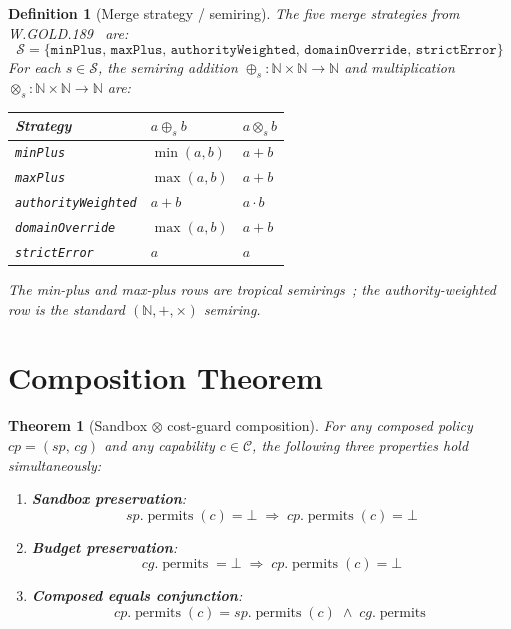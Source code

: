 \documentclass[sigconf]{acmart}
\newtheorem{definition}{Definition}
\newtheorem{theorem}{Theorem}
\newcommand{\compose}{\mathbin{\otimes}}
\newcommand{\permits}{\operatorname{permits}}
\newcommand{\mergeadd}{\mathbin{\oplus}}
\newcommand{\mergemul}{\mathbin{\otimes}}
\newcommand{\SP}{\mathit{sp}}
\newcommand{\CG}{\mathit{cg}}
\newcommand{\CP}{\mathit{cp}}
\begin{document}
\begin{definition}[Merge strategy / semiring]
\label{def:semiring}
The five \emph{merge strategies} from W.GOLD.189~\cite{paper-3-crdt-ecoop2027}
are:
\[
  \mathcal{S} = \{\texttt{minPlus},\,\texttt{maxPlus},\,\texttt{authorityWeighted},\,\texttt{domainOverride},\,\texttt{strictError}\}
\]
For each $s \in \mathcal{S}$, the semiring addition
$\mergeadd_s : \mathbb{N} \times \mathbb{N} \to \mathbb{N}$ and
multiplication $\mergemul_s : \mathbb{N} \times \mathbb{N} \to \mathbb{N}$
are:

\medskip
\begin{center}
\begin{tabular}{lll}
\toprule
Strategy & $a \mergeadd_s b$ & $a \mergemul_s b$ \\
\midrule
\texttt{minPlus}           & $\min(a,b)$      & $a + b$ \\
\texttt{maxPlus}           & $\max(a,b)$      & $a + b$ \\
\texttt{authorityWeighted} & $a + b$          & $a \cdot b$ \\
\texttt{domainOverride}    & $\max(a,b)$      & $a + b$ \\
\texttt{strictError}       & $a$              & $a$ \\
\bottomrule
\end{tabular}
\end{center}
\medskip

The min-plus and max-plus rows are tropical semirings~\cite{mohri2002semiring,green-semiring2007};
the authority-weighted row is the standard $(\mathbb{N},+,\times)$ semiring.
\end{definition}

\section{Composition Theorem}
\label{sec:theorem}

\begin{theorem}[Sandbox $\compose$ cost-guard composition]
\label{thm:main}
For any composed policy $\CP = (\SP,\,\CG)$ and any capability $c \in
\mathcal{C}$, the following three properties hold simultaneously:

\begin{enumerate}
  \item \textbf{Sandbox preservation}:
        \[\SP.\permits(c) = \bot \;\Longrightarrow\; \CP.\permits(c) = \bot\]
  \item \textbf{Budget preservation}:
        \[\CG.\permits = \bot \;\Longrightarrow\; \CP.\permits(c) = \bot\]
  \item \textbf{Composed equals conjunction}:
        \[\CP.\permits(c) = \SP.\permits(c) \;\wedge\; \CG.\permits\]
\end{enumerate}
\end{theorem}
\end{document}
